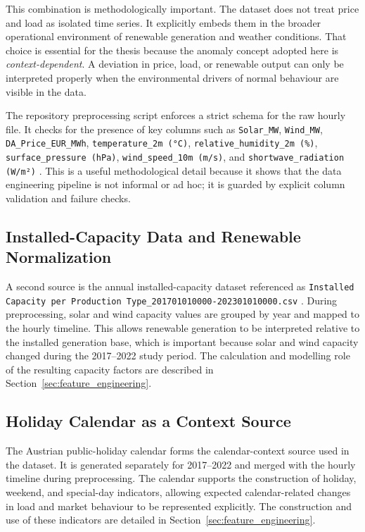 This combination is methodologically important. The dataset does not treat price and load as isolated time series. It explicitly embeds them in the broader operational environment of renewable generation and weather conditions. That choice is essential for the thesis because the anomaly concept adopted here is \emph{context-dependent}. A deviation in price, load, or renewable output can only be interpreted properly when the environmental drivers of normal behaviour are visible in the data.

The repository preprocessing script enforces a strict schema for the raw hourly file. It checks for the presence of key columns such as \texttt{Solar\_MW}, \texttt{Wind\_MW}, \texttt{DA\_Price\_EUR\_MWh}, \texttt{temperature\_2m (°C)}, \texttt{relative\_humidity\_2m (\%)}, \texttt{surface\_pressure (hPa)}, \texttt{wind\_speed\_10m (m/s)}, and \texttt{shortwave\_radiation (W/m²)} \cite{repo_thesis_grid_anomaly}. This is a useful methodological detail because it shows that the data engineering pipeline is not informal or ad hoc; it is guarded by explicit column validation and failure checks.

\subsection{Installed-Capacity Data and Renewable Normalization}

A second source is the annual installed-capacity dataset referenced as \texttt{Installed Capacity per Production Type\_201701010000-202301010000.csv} \cite{repo_thesis_grid_anomaly}. During preprocessing, solar and wind capacity values are grouped by year and mapped to the hourly timeline. This allows renewable generation to be interpreted relative to the installed generation base, which is important because solar and wind capacity changed during the 2017--2022 study period. The calculation and modelling role of the resulting capacity factors are described in Section~\ref{sec:feature_engineering}.

\subsection{Holiday Calendar as a Context Source}

The Austrian public-holiday calendar forms the calendar-context source used in the dataset. It is generated separately for 2017--2022 and merged with the hourly timeline during preprocessing. The calendar supports the construction of holiday, weekend, and special-day indicators, allowing expected calendar-related changes in load and market behaviour to be represented explicitly. The construction and use of these indicators are detailed in Section~\ref{sec:feature_engineering}.


